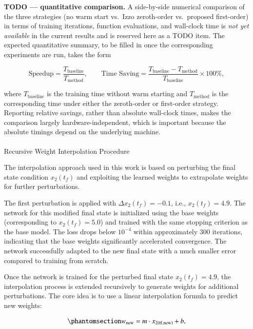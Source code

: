 \documentclass[
  number,
  preprint]{elsarticle}
\makeatletter
\let\oldparagraph\paragraph
\renewcommand{\paragraph}{
    \@ifstar
      \xxxParagraphStar
      \xxxParagraphNoStar
  }
\newcommand{\xxxParagraphStar}[1]{\oldparagraph*{#1}\mbox{}}
\newcommand{\xxxParagraphNoStar}[1]{\oldparagraph{#1}\mbox{}}
\makeatother
\begin{document}
\textbf{TODO --- quantitative comparison.} A side-by-side numerical
comparison of the three strategies (no warm start vs.~Izzo zeroth-order
vs.~proposed first-order) in terms of training iterations, function
evaluations, and wall-clock time is \emph{not yet available} in the
current results and is reserved here as a TODO item. The expected
quantitative summary, to be filled in once the corresponding experiments
are run, takes the form

\[
\text{Speedup}
=
\frac{T_{\text{baseline}}}{T_{\text{method}}},
\qquad
\text{Time Saving}
=
\frac{T_{\text{baseline}}-T_{\text{method}}}{T_{\text{baseline}}}\times 100\%,
\]

where \(T_{\text{baseline}}\) is the training time without warm starting
and \(T_{\text{method}}\) is the corresponding time under either the
zeroth-order or first-order strategy. Reporting relative savings, rather
than absolute wall-clock times, makes the comparison largely
hardware-independent, which is important because the absolute timings
depend on the underlying machine.

\paragraph{Recursive Weight Interpolation
Procedure}\label{recursive-weight-interpolation-procedure}

The interpolation approach used in this work is based on perturbing the
final state condition \(x_2(t_f)\) and exploiting the learned weights to
extrapolate weights for further perturbations.

The first perturbation is applied with \(\Delta x_2(t_f) = -0.1\), i.e.,
\(x_2(t_f) = 4.9\). The network for this modified final state is
initialized using the base weights (corresponding to \(x_2(t_f) = 5.0\))
and trained with the same stopping criterion as the base model. The loss
drops below \(10^{-4}\) within approximately 300 iterations, indicating
that the base weights significantly accelerated convergence. The network
successfully adapted to the new final state with a much smaller error
compared to training from scratch.

Once the network is trained for the perturbed final state
\(x_2(t_f) = 4.9\), the interpolation process is extended recursively to
generate weights for additional perturbations. The core idea is to use a
linear interpolation formula to predict new weights:

\begin{equation}\protect\phantomsection\label{eq-ch3-interpolation}{
w_{\text{new}} = m \cdot x_{2\text{(tf,new)}} + b,
}\end{equation}
\end{document}
